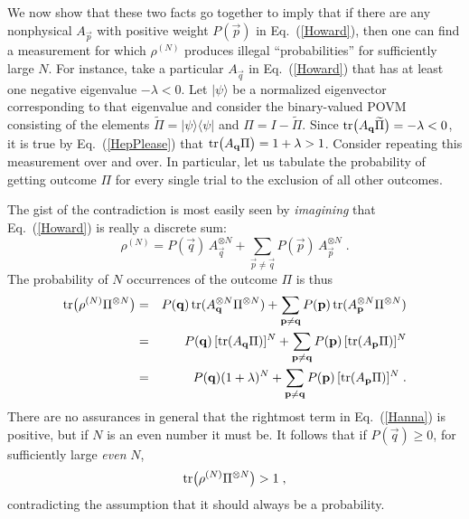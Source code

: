 We now show that these two facts go together to imply that if
there are any nonphysical $A_{\vec{p}}$ with positive weight
$P(\vec{p})$ in Eq.~(\ref{Howard}), then one can find a
measurement for which $\rho^{(N)}$ produces illegal
``probabilities'' for sufficiently large $N$.  For instance, take
a particular $A_{\vec{q}}$ in Eq.~(\ref{Howard}) that has at least
one negative eigenvalue $-\lambda<0$.  Let $|\psi\rangle$ be a
normalized eigenvector corresponding to that eigenvalue and
consider the binary-valued POVM consisting of the elements
$\widetilde{\Pi}=|\psi\rangle\langle\psi|$ and
$\Pi=I-\widetilde{\Pi}$.  Since ${\rm
tr}\big(A_{\vec{q}}\widetilde{\Pi}\big)=-\lambda<0$, it is true by
Eq.~(\ref{HepPlease}) that ${\rm
tr}\big(A_{\vec{q}}\Pi\big)=1+\lambda >1$. Consider repeating this
measurement over and over. In particular, let us tabulate the
probability of getting outcome $\Pi$ for every single trial to the
exclusion of all other outcomes.

The gist of the contradiction is most easily seen by {\it imagining\/}
that Eq.~(\ref{Howard}) is really a discrete sum:
\begin{equation}
\rho^{(N)}= P(\vec{q})\,A_{\vec{q}}^{\otimes
N}+\sum_{\vec{p}\ne\vec{q}}P(\vec{p})\,A_{\vec{p}}^{\otimes N}\;.
\end{equation}
The probability of $N$ occurrences of the outcome $\Pi$ is thus
\begin{eqnarray}
{\rm tr}\big(\rho^{(N)}\Pi^{\otimes N}\big)
&=&
P(\vec{q})\,{\rm tr}(A_{\vec{q}}^{\otimes N}\Pi^{\otimes N})
+\sum_{\vec{p}\ne\vec{q}}P(\vec{p})\,{\rm tr}(A_{\vec{p}}^{\otimes
N}\Pi^{\otimes N})
\nonumber\\
&=&
P(\vec{q})\,[{\rm tr}(A_{\vec{q}}\Pi)]^N
+\sum_{\vec{p}\ne\vec{q}}P(\vec{p})\,[{\rm tr}(A_{\vec{p}}\Pi)]^N
\nonumber\\
&=&
P(\vec{q})(1+\lambda)^N +\sum_{\vec{p}\ne\vec{q}}P(\vec{p})\,[{\rm
tr}(A_{\vec{p}}\Pi)]^N\;.
\label{Hanna}
\end{eqnarray}
There are no assurances in general that the rightmost term in
Eq.~(\ref{Hanna}) is positive, but if $N$ is an even number it
must be.  It follows that if $P(\vec{q})\ge0$, for sufficiently
large {\it even\/} $N$,
\begin{equation}
{\rm tr}\big(\rho^{(N)}\Pi^{\otimes N}\big)>1\;,
\label{BigBoy}
\end{equation}
contradicting the assumption that it should always be a probability.


